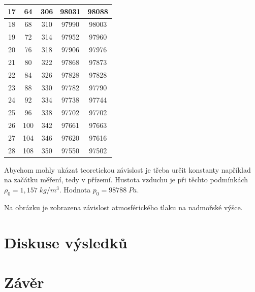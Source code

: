 \begin{table}[h]
\begin{tabular}{|c|c|c|c|c|}
17          & 64      & 306           & 98031 & 98088 \\ \hline
18          & 68      & 310           & 97990 & 98003 \\ \hline
19          & 72      & 314           & 97952 & 97960 \\ \hline
20          & 76      & 318           & 97906 & 97976 \\ \hline
21          & 80      & 322           & 97868 & 97873 \\ \hline
22          & 84      & 326           & 97828 & 97828 \\ \hline
23          & 88      & 330           & 97782 & 97790 \\ \hline
24          & 92      & 334           & 97738 & 97744 \\ \hline
25          & 96      & 338           & 97702 & 97702 \\ \hline
26          & 100     & 342           & 97661 & 97663 \\ \hline
27          & 104     & 346           & 97620 & 97616 \\ \hline
28          & 108     & 350           & 97550 & 97502 \\ \hline
\end{tabular}
\end{table}

Abychom mohly ukázat teoretickou závislost je třeba určit konstanty například na začátku měření, tedy v přízemí. Hustota vzduchu je při těchto podmínkách $\rho_0 = 1,157 \; kg/m^3$. Hodnota $p_0 = 98 788 \; Pa$.

Na obrázku je zobrazena závislost atmosférického tlaku na nadmořské výšce.
    
\section{Diskuse výsledků}

\section{Závěr}
